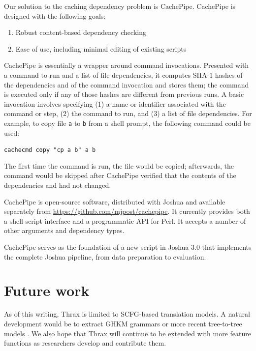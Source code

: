 \documentclass[11pt]{article}
\begin{document}
Our solution to the caching dependency problem is CachePipe.
CachePipe is designed with the following goals:

\begin{enumerate}
\item Robust content-based dependency checking
\item Ease of use, including minimal editing of existing scripts
\end{enumerate}

\noindent CachePipe is essentially a wrapper around command
invocations.  Presented with a command to run
and a list of file dependencies, it computes SHA-1 hashes of the
dependencies and of the command invocation and stores them; the
command is executed only if any of those hashes are different from
previous runs.  A
basic invocation involves specifying (1) a name or identifier
associated with the command or step, (2) the command to run, and (3) a
list of file dependencies.  For example, to copy file \verb|a| to
\verb|b| from a shell prompt, the following command could be used:

\verb|cachecmd copy "cp a b" a b|

\noindent The first time the command is run, the file would be copied;
afterwards, the command would be skipped after CachePipe verified that
the contents of the dependencies and had not changed.

CachePipe is open-source software, distributed with Joshua
and available separately from
\url{https://github.com/mjpost/cachepipe}.  It currently provides both
a shell script interface and a programmatic API for Perl.  It accepts
a number of other arguments and dependency types.

CachePipe serves as the foundation of a new script in Joshua 3.0 that
implements the complete Joshua pipeline, from data preparation to
evaluation.

\section{Future work}

As of this writing, Thrax is limited to SCFG-based translation models.
A natural development would be to extract GHKM grammars
\cite{galley2004whats} or more recent tree-to-tree models
\cite{zhang2008,liu2009,chiang2010}.  We also hope that Thrax will
continue to be extended with more feature functions as researchers
develop and contribute them.




\end{document}
